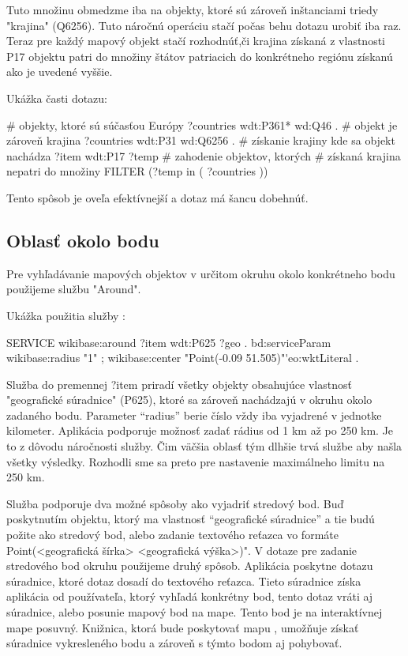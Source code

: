 Tuto množinu obmedzme iba na objekty, ktoré sú zároveň inštanciami triedy "krajina" (Q6256). Tuto náročnú operáciu 
stačí počas behu dotazu urobiť iba raz. Teraz pre každý mapový objekt stačí rozhodnúť,či krajina získaná z vlastnosti P17 objektu patri do množiny štátov patriacich  
do konkrétneho regiónu získanú ako je uvedené vyššie.  

Ukážka časti dotazu: 
\begin{code}
      # objekty, ktoré sú súčasťou Európy 
      ?countries wdt:P361* wd:Q46 . 
      # objekt je zároveň krajina 
      ?countries wdt:P31 wd:Q6256 . 
      # získanie krajiny kde sa objekt nachádza 
      ?item wdt:P17 ?temp 
      # zahodenie objektov, ktorých 
      # získaná krajina nepatri do množiny 
      FILTER (?temp in ( ?countries ))
\end{code}

Tento spôsob je oveľa efektívnejší a dotaz má šancu dobehnúť. 

\subsection*{Oblasť okolo bodu }
Pre vyhľadávanie mapových objektov v určitom okruhu okolo konkrétneho bodu použijeme službu "Around". 

Ukážka použitia služby : 
\begin{code}
      SERVICE wikibase:around {
      ?item wdt:P625 ?geo .
      bd:serviceParam wikibase:radius "1" ;
      wikibase:center "Point(-0.09 51.505)"^^geo:wktLiteral . }
\end{code}

Služba do premennej ?item priradí všetky objekty obsahujúce vlastnosť "geografické súradnice" (P625), ktoré sa zároveň nachádzajú 
v okruhu okolo zadaného bodu. 
Parameter “radius” berie číslo vždy iba vyjadrené v jednotke kilometer. Aplikácia podporuje možnosť zadať rádius od 1 km až po 250 km. 
Je to z dôvodu náročnosti služby. Čim väčšia oblasť tým dlhšie trvá službe aby našla všetky výsledky. Rozhodli sme sa preto pre nastavenie maximálneho limitu na 250 km. 

Služba podporuje dva možné spôsoby ako vyjadriť stredový bod. Buď poskytnutím objektu, ktorý ma vlastnosť “geografické súradnice” a tie budú požite 
ako stredový bod, alebo zadanie textového reťazca vo formáte Point(<geografická šírka> <geografická výška>)". 
V dotaze pre zadanie stredového bod okruhu použijeme druhý spôsob. Aplikácia poskytne dotazu súradnice, ktoré dotaz dosadí do textového reťazca. 
Tieto súradnice získa aplikácia od používateľa, ktorý vyhľadá konkrétny bod, tento dotaz vráti aj súradnice, alebo posunie mapový bod na mape.
Tento bod je na interaktívnej mape posuvný. Knižnica, ktorá bude poskytovať mapu , umožňuje získať súradnice vykresleného bodu a zároveň s týmto bodom aj pohybovať. 

